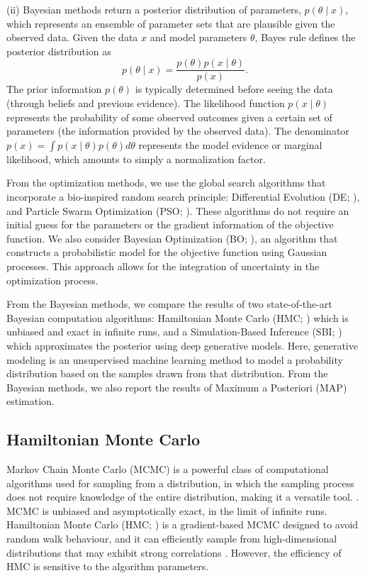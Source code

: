 \documentclass[preprint,11pt,authoryear]{elsarticle}
\begin{document}
(ii) Bayesian methods return a posterior distribution of parameters, $ p(\theta \mid x)$, which represents an ensemble of parameter sets that are plausible given the observed data. Given the data $x$ and model parameters $\theta$, Bayes rule defines the posterior distribution as
\begin{equation}
    p(\theta \mid x) = \frac{p(\theta) p(x \mid \theta)}{p(x)}. \label{eq:Bayes_rule}
\end{equation}
The prior information $p(\theta)$ is typically determined before seeing the data (through beliefs and previous evidence). The likelihood function $p(x \mid \theta)$ represents the probability of some observed outcomes given a certain set of parameters (the information provided by the observed data). The denominator $p(x)=\int p(x \mid \theta)p(\theta)d\theta$ represents the model evidence or marginal likelihood, which amounts to simply a normalization factor.


From the optimization methods, we use the global search algorithms that incorporate a bio-inspired random search principle: Differential Evolution (DE; \cite{Storn1997, Price1999}), and Particle Swarm Optimization (PSO; \cite{Kennedy1995, Eberhart1995}). These algorithms do not require an initial guess for the parameters or the gradient information of the objective function. We also consider Bayesian Optimization (BO; \cite{Snoek2012, Shahriari2015}), an algorithm that constructs a probabilistic model for the objective function using Gaussian processes. This approach allows for the integration of uncertainty in the optimization process.


From the Bayesian methods, we compare the results of two state-of-the-art Bayesian computation algorithms: Hamiltonian Monte Carlo (HMC; \cite{Duane1987, Neal2010}) which is unbiased and exact in infinite runs, and a Simulation-Based Inference (SBI; \cite{Cranmer2020, Brehmer2021}) which approximates the posterior using deep generative models. Here, generative modeling is an unsupervised machine learning method to model a probability distribution based on the samples drawn from that distribution.  From the Bayesian methods, we also report the results of Maximum a Posteriori (MAP) estimation. 



\subsection{Hamiltonian Monte Carlo}

Markov Chain Monte Carlo (MCMC) is a powerful class of computational algorithms used for sampling from a distribution, in which the sampling process does not require knowledge of the entire distribution, making it a versatile tool. \citep{Andrieu2003, Murphy2022, Mcelreath2020}. MCMC is unbiased and asymptotically exact, in the limit of infinite runs. Hamiltonian Monte Carlo (HMC; \cite{Duane1987, Neal2010}) is a gradient-based MCMC designed to avoid random walk behaviour, and it can efficiently sample from high-dimensional distributions that may exhibit strong correlations \citep{Betancourt2017}. However, the efficiency of HMC is sensitive to the algorithm parameters. 
\end{document}
